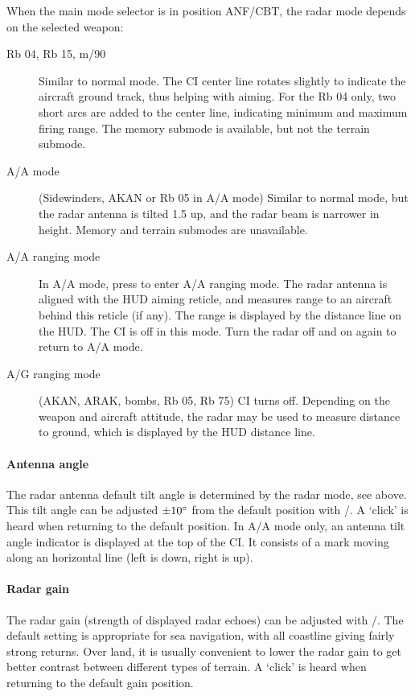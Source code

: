 When the main mode selector is in position ANF/CBT, the radar mode depends on the selected weapon:
\begin{description}
  \item[Rb 04, Rb 15, m/90] Similar to normal mode.
    The CI center line rotates slightly to indicate the aircraft ground track, thus helping with aiming.
    For the Rb 04 only, two short arcs are added to the center line, indicating minimum and maximum firing range.
    The memory submode is available, but not the terrain submode.
  \item[A/A mode] (Sidewinders, AKAN or Rb 05 in A/A mode)
    Similar to normal mode, but the radar antenna is tilted 1.5\textdegree{} up,
    and the radar beam is narrower in height.
    Memory and terrain submodes are unavailable.
  \item[A/A ranging mode] In A/A mode, press  to enter A/A ranging mode.
    The radar antenna is aligned with the HUD aiming reticle,
    and measures range to an aircraft behind this reticle (if any).
    The range is displayed by the distance line on the HUD.
    The CI is off in this mode. Turn the radar off and on again to return to A/A mode.
  \item[A/G ranging mode] (AKAN, ARAK, bombs, Rb 05, Rb 75)
    CI turns off. Depending on the weapon and aircraft attitude,
    the radar may be used to measure distance to ground, which is displayed by the HUD distance line.
\end{description}

\paragraph{Antenna angle}
The radar antenna default tilt angle is determined by the radar mode, see above.
This tilt angle can be adjusted $\pm 10 \degree$ from the default position with \keys{<}/\keys{>}.
A `click' is heard when returning to the default position.
In A/A mode only, an antenna tilt angle indicator is displayed at the top of the CI.
It consists of a mark moving along an horizontal line (left is down, right is up).

\paragraph{Radar gain}
The radar gain (strength of displayed radar echoes) can be adjusted with \keys{\{}/\keys{\}}.
The default setting is appropriate for sea navigation, with all coastline giving fairly strong returns.
Over land, it is usually convenient to lower the radar gain
to get better contrast between different types of terrain.
A `click' is heard when returning to the default gain position.
